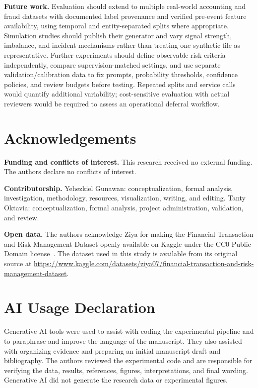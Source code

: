 \documentclass{llncs}
\begin{document}
\textbf{Future work.} Evaluation should extend to multiple real-world accounting and fraud datasets with documented label provenance and verified pre-event feature availability, using temporal and entity-separated splits where appropriate. Simulation studies should publish their generator and vary signal strength, imbalance, and incident mechanisms rather than treating one synthetic file as representative. Further experiments should define observable risk criteria independently, compare supervision-matched settings, and use separate validation/calibration data to fix prompts, probability thresholds, confidence policies, and review budgets before testing. Repeated splits and service calls would quantify additional variability; cost-sensitive evaluation with actual reviewers would be required to assess an operational deferral workflow.

\section*{Acknowledgements}

\textbf{Funding and conflicts of interest.} This research received no external funding. The authors declare no conflicts of interest.

\textbf{Contributorship.} Yehezkiel Gunawan: conceptualization, formal analysis, investigation, methodology, resources, visualization, writing, and editing. Tanty Oktavia: conceptualization, formal analysis, project administration, validation, and review.

\textbf{Open data.} The authors acknowledge Ziya for making the Financial Transaction and Risk Management Dataset openly available on Kaggle under the CC0 Public Domain license~\cite{ziya2025dataset}. The dataset used in this study is available from its original source at \url{https://www.kaggle.com/datasets/ziya07/financial-transaction-and-risk-management-dataset}.

\section*{AI Usage Declaration}
Generative AI tools were used to assist with coding the experimental pipeline and to paraphrase and improve the language of the manuscript. They also assisted with organizing evidence and preparing an initial manuscript draft and bibliography. The authors reviewed the experimental code and are responsible for verifying the data, results, references, figures, interpretations, and final wording. Generative AI did not generate the research data or experimental figures.



\end{document}
